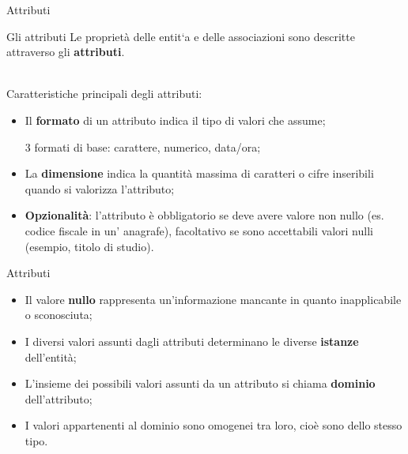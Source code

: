 %
\begin{frame}{Attributi}
\begin{minipage}{0.9\textwidth}
\begin{block}{Gli attributi}
Le propriet\`a delle entit`a e delle associazioni sono descritte attraverso gli \textbf{attributi}.
\end{block}
\end{minipage}
\pause
\newline
\\Caratteristiche principali degli attributi:
\begin{itemize}[<+->]
    \item Il \textbf{formato} di un attributo indica il tipo di valori che assume;
    
    3 formati di base: carattere, numerico, data/ora;
    \item La \textbf{dimensione} indica la quantit\`a massima di caratteri o cifre inseribili quando si valorizza l'attributo;
    \item \textbf{Opzionalit\`a}: l'attributo \`e obbligatorio se deve avere valore non nullo (es. codice fiscale in un' anagrafe), facoltativo se sono accettabili valori nulli (esempio, titolo di studio).
\end{itemize}
\end{frame}
%
\begin{frame}{Attributi}
\begin{itemize}[<+->]
    \item Il valore \textbf{nullo} rappresenta un'informazione mancante in quanto inapplicabile o sconosciuta;
    \item I diversi valori assunti dagli attributi determinano le diverse \textbf{istanze} dell'entit\`a;
    \item L'insieme dei possibili valori assunti da un attributo si chiama  \textbf{dominio} dell'attributo;
    \item I valori appartenenti al dominio sono omogenei tra loro, cio\`e sono dello stesso tipo.
\end{itemize}
\end{frame}
%
